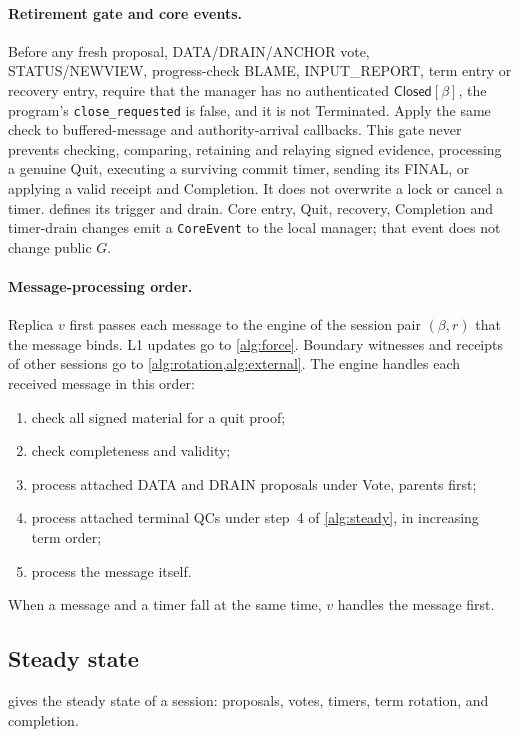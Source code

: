 \documentclass[11pt,a4paper]{article}
\newcommand{\RR}[1]{{\color{rrRed}#1}}
\newcommand{\tagg}[1]{\ensuremath{\mathsf{#1}}}
\begin{document}
\paragraph{Retirement gate and core events.}
Before any fresh proposal, DATA/DRAIN/ANCHOR vote, STATUS/NEWVIEW,
progress-check BLAME, INPUT\_REPORT, term entry or recovery entry, require that
the manager has no authenticated $\tagg{Closed}[\beta]$, the program's
\texttt{close\_requested} is false, and it is not Terminated.
Apply the same check to buffered-message and authority-arrival callbacks.
This gate never prevents checking, comparing, retaining and relaying
signed evidence, processing a genuine Quit, executing a surviving commit
timer, sending its FINAL, or applying a valid receipt and Completion.
It does not overwrite a lock or cancel a timer. 
defines its trigger and drain. Core entry, Quit, recovery, Completion
and timer-drain changes emit a \texttt{CoreEvent} to the local manager;
that event does not change public $G$.

\paragraph{Message-processing order.}\leavevmode
\RR{Replica $v$ first passes each message to the engine of the session
pair $(\beta,r)$ that the message binds. L1 updates go to \cref{alg:force}. Boundary witnesses and receipts of
other sessions go to \cref{alg:rotation,alg:external}.} The engine handles each received
message in this order:
\begin{enumerate}[label=(\arabic*)]
\item check all signed material for a quit proof;
\item check completeness and validity;
\item process attached DATA \RR{and DRAIN} proposals under Vote, parents
first;
\item process attached terminal QCs under step~4 of \cref{alg:steady},
in increasing term order;
\item process the message itself.
\end{enumerate}
When a message and a timer fall at the same time, $v$ handles the
message first.

\subsection{Steady state}
\label{sec:steady}
 gives the steady state of a session: proposals, votes,
timers, term rotation, and completion.
\end{document}
